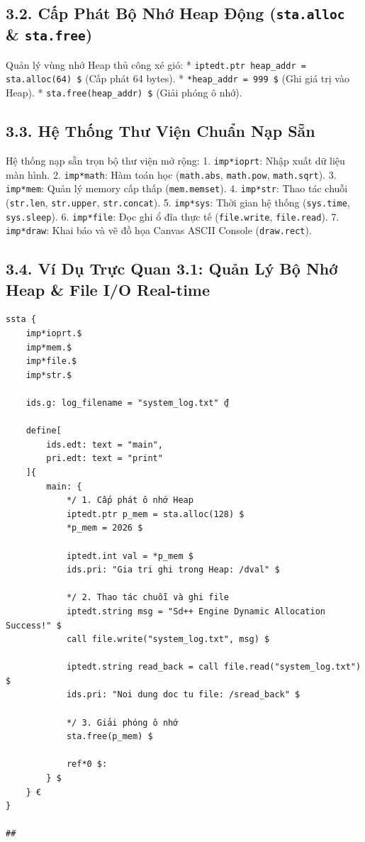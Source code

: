 \documentclass[11pt, a4paper]{article}
\begin{document}
\subsection{3.2. Cấp Phát Bộ Nhớ Heap Động (\texttt{sta.alloc} \& \texttt{sta.free})}
Quản lý vùng nhớ Heap thủ công xé gió:
* \texttt{iptedt.ptr heap\_addr = sta.alloc(64) \$} (Cấp phát 64 bytes).
* \texttt{*heap\_addr = 999 \$} (Ghi giá trị vào Heap).
* \texttt{sta.free(heap\_addr) \$} (Giải phóng ô nhớ).

\subsection{3.3. Hệ Thống Thư Viện Chuẩn Nạp Sẵn}
Hệ thống nạp sẵn trọn bộ thư viện mở rộng:
1. \texttt{imp*ioprt}: Nhập xuất dữ liệu màn hình.
2. \texttt{imp*math}: Hàm toán học (\texttt{math.abs}, \texttt{math.pow}, \texttt{math.sqrt}).
3. \texttt{imp*mem}: Quản lý memory cấp thấp (\texttt{mem.memset}).
4. \texttt{imp*str}: Thao tác chuỗi (\texttt{str.len}, \texttt{str.upper}, \texttt{str.concat}).
5. \texttt{imp*sys}: Thời gian hệ thống (\texttt{sys.time}, \texttt{sys.sleep}).
6. \texttt{imp*file}: Đọc ghi ổ đĩa thực tế (\texttt{file.write}, \texttt{file.read}).
7. \texttt{imp*draw}: Khai báo và vẽ đồ họa Canvas ASCII Console (\texttt{draw.rect}).

\subsection{3.4. Ví Dụ Trực Quan 3.1: Quản Lý Bộ Nhớ Heap \& File I/O Real-time}
\begin{lstlisting}[caption={Chương trình thao tác con trỏ Heap và ghi file ổ đĩa}]
ssta {
    imp*ioprt.$
    imp*mem.$
    imp*file.$
    imp*str.$

    ids.g: log_filename = "system_log.txt" ₫

    define[
        ids.edt: text = "main",
        pri.edt: text = "print"
    ]{
        main: {
            */ 1. Cấp phát ô nhớ Heap
            iptedt.ptr p_mem = sta.alloc(128) $
            *p_mem = 2026 $

            iptedt.int val = *p_mem $
            ids.pri: "Gia tri ghi trong Heap: /dval" $

            */ 2. Thao tác chuỗi và ghi file
            iptedt.string msg = "Sd++ Engine Dynamic Allocation Success!" $
            call file.write("system_log.txt", msg) $

            iptedt.string read_back = call file.read("system_log.txt") $
            ids.pri: "Noi dung doc tu file: /sread_back" $

            */ 3. Giải phóng ô nhớ
            sta.free(p_mem) $

            ref*0 $:
        } $
    } €
}

##
\end{lstlisting}
\end{document}
